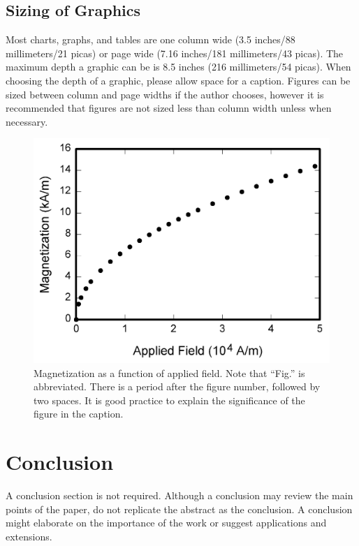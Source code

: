 \documentclass[journal]{IEEEtran}
\begin{document}
\subsection{Sizing of Graphics}
Most charts, graphs, and tables are one column wide (3.5 inches/88 
millimeters/21 picas) or page wide (7.16 inches/181 millimeters/43 
picas). The maximum depth a graphic can be is 8.5 inches (216 millimeters/54
picas). When choosing the depth of a graphic, please allow space for a 
caption. Figures can be sized between column and page widths if the author 
chooses, however it is recommended that figures are not sized less than 
column width unless when necessary. 

\begin{figure}
\centerline{\includegraphics[width=\columnwidth]{fig1.png}}
\caption{Magnetization as a function of applied field. Note that ``Fig.'' is abbreviated. There is a period after the figure number, followed by two spaces. It is good practice to explain the significance of the figure in the caption.}
\end{figure}


\section{Conclusion}

A conclusion section is not required. Although a conclusion may review the main points of the paper, do not replicate the abstract as the conclusion. A conclusion might elaborate on the importance of the work or suggest applications and extensions. 
\end{document}
